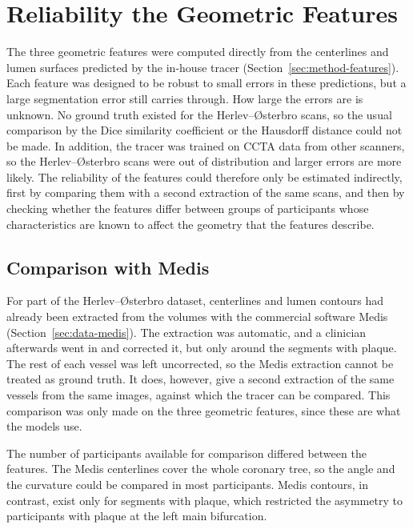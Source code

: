 \section{Reliability the Geometric Features}
\label{sec:method-validity}
\label{sec:method-medis}

The three geometric features were computed directly from the centerlines and lumen surfaces predicted by the in-house tracer (Section~\ref{sec:method-features}).
Each feature was designed to be robust to small errors in these predictions, but a large segmentation error still carries through.
How large the errors are is unknown.
No ground truth existed for the Herlev--{\O}sterbro scans, so the usual comparison by the Dice similarity coefficient or the Hausdorff distance could not be made.
In addition, the tracer was trained on CCTA data from other scanners, so the Herlev--{\O}sterbro scans were out of distribution and larger errors are more likely.
The reliability of the features could therefore only be estimated indirectly, first by comparing them with a second extraction of the same scans, and then by checking whether the features differ between groups of participants whose characteristics are known to affect the geometry that the features describe.


\subsection{Comparison with Medis}
\label{sec:method-medis-pairs}
\label{sec:method-medis-agreement}

For part of the Herlev--{\O}sterbro dataset, centerlines and lumen contours had already been extracted from the volumes with the commercial software Medis (Section~\ref{sec:data-medis}).
The extraction was automatic, and a clinician afterwards went in and corrected it, but only around the segments with plaque.
The rest of each vessel was left uncorrected, so the Medis extraction cannot be treated as ground truth.
It does, however, give a second extraction of the same vessels from the same images, against which the tracer can be compared.
This comparison was only made on the three geometric features, since these are what the models use.

The number of participants available for comparison differed between the features.
The Medis centerlines cover the whole coronary tree, so the angle and the curvature could be compared in most participants.
Medis contours, in contrast, exist only for segments with plaque, which restricted the asymmetry to participants with plaque at the left main bifurcation.

